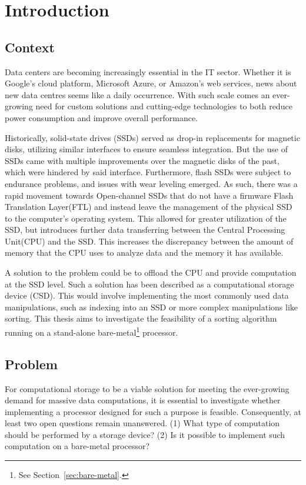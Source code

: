 \section{Introduction}
\subsection{Context}\label{sec:context}
Data centers are becoming increasingly essential in the IT sector. Whether it is
Google's cloud platform, Microsoft Azure, or Amazon's web services, news about
new data centres seems like a daily occurrence\cite{datacenters}. With such scale comes an
ever-growing need for custom solutions and cutting-edge technologies to both
reduce power consumption and improve overall performance.

Historically, solid-state drives (SSDs) served as drop-in replacements for
magnetic disks, utilizing similar interfaces to ensure seamless
integration\cite{ssd_interface}. But the use of SSDs came with multiple
improvements over the magnetic disks of the past, which were hindered by said
interface. Furthermore, flash SSDs were subject to endurance problems, and
issues with wear leveling emerged\cite{write_endurance, NAND_future}. As such,
there was a rapid movement towards Open-channel SSDs that do not have a firmware
Flash Translation Layer(FTL) and instead leave the management of the physical
SSD to the computer's operating system\cite{LightNVM, open-channel}. This
allowed for greater utilization of the SSD, but introduces further data
transferring between the Central Processing Unit(CPU) and the SSD. This
increases the discrepancy between the amount of memory that the CPU uses to
analyze data and the memory it has available\cite{CSDWhereAreWe}.

A solution to the problem could be to offload the CPU and provide computation at
the SSD level. Such a solution has been described as a computational storage
device (CSD)\cite{CSD_what}. This would involve implementing the most commonly used data
manipulations, such as indexing into an SSD or more complex manipulations like
sorting. This thesis aims to investigate the feasibility of a sorting algorithm
running on a stand-alone bare-metal\footnote{\label{note:1}See
Section~\ref{sec:bare-metal}.} processor.


\subsection{Problem}\label{sec:problem}
For computational storage to be a viable solution for meeting the ever-growing
demand for massive data computations, it is essential to investigate whether
implementing a processor designed for such a purpose is feasible. Consequently,
at least two open questions remain unanswered. (1) What type of computation should be
performed by a storage device? (2) Is it possible to implement such computation
on a bare-metal processor?

